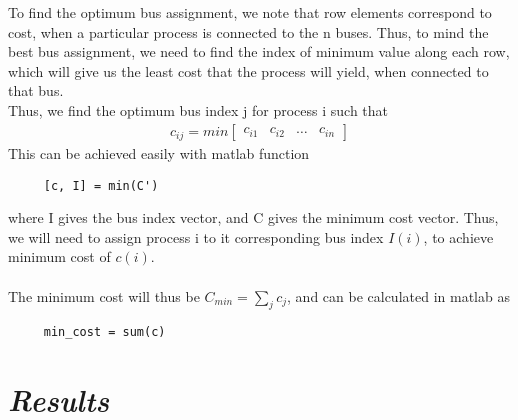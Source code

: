 \documentclass[12pt, twocolumn]{extreport}
\begin{document}
	 To find the optimum bus assignment, we note that row elements correspond to cost, when a particular process is connected to the n buses. Thus, to mind the best bus assignment, we need to find the index of minimum value along each row, which will give us the least cost that the process will yield, when connected to that bus. \\  Thus, we find the optimum bus index j for process i such that \begin{align}
	 c_{ij} = min{\begin{bmatrix*}
	 	c_{i1} & c_{i2} & \ldots & c_{in}
	 	\end{bmatrix*}}
	 \end{align} 
	 This can be achieved easily with matlab function \begin{verbatim}
	 [c, I] = min(C')
	 \end{verbatim}
	 
	 where I gives the bus index vector, and C gives the minimum cost vector. Thus, we will need to assign process i to it corresponding bus index $ I(i) $, to achieve minimum cost of $ c(i) $. \\ \\
	 The minimum cost will thus be $ C_{min} = \sum_{j} c_{j} $, and can be calculated in matlab as 
	 \begin{verbatim}
	 min_cost = sum(c)
	 \end{verbatim}
	 
	 \section[Results]{\textit{Results}} 
\end{document}
